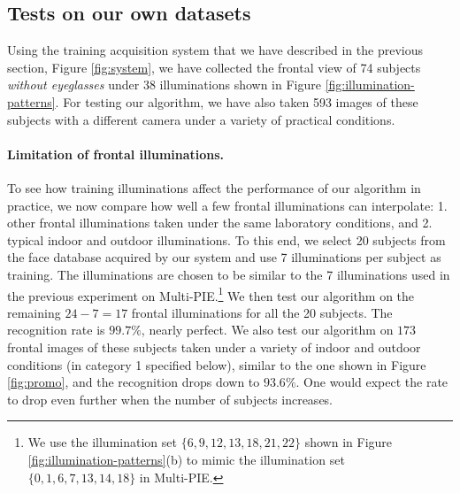 \documentclass[10pt,twocolumn,letterpaper]{article}
\begin{document}
\subsection{Tests on our own datasets}\label{sec:own-data}\vspace{-2mm}
Using the training acquisition system that we have described in the previous section, Figure \ref{fig:system}, we have collected the frontal view of 74 subjects {\em without eyeglasses} under 38 illuminations shown in Figure \ref{fig:illumination-patterns}. For testing our algorithm, we have also taken 593 images of these subjects with a different camera under a variety of practical conditions.\vspace{-4mm}

\paragraph{Limitation of frontal illuminations.}
To see how training illuminations affect the performance of our algorithm in practice, we now compare how well a few frontal illuminations can interpolate: 1. other frontal illuminations taken under the same laboratory conditions, and 2. typical indoor and outdoor illuminations. To this end, we select 20 subjects from the face database acquired by our system and use 7 illuminations per subject as training. The illuminations are chosen to be similar to the 7 illuminations used in the previous experiment on Multi-PIE.\footnote{We use the illumination set $\{6, 9, 12, 13, 18, 21, 22\}$ shown in Figure \ref{fig:illumination-patterns}(b) to mimic the illumination set $\{0, 1, 6, 7, 13, 14, 18\}$ in Multi-PIE.} We then test our algorithm on the remaining $24 - 7 = 17$ frontal illuminations for all the 20 subjects. The recognition rate is $99.7\%$, nearly perfect. We also test our algorithm on $173$ frontal images of these subjects taken under a variety of indoor and outdoor conditions (in category 1 specified below), similar to the one shown in Figure \ref{fig:promo}, and the recognition drops down to $93.6\%$. One would expect the rate to drop even further when the number of subjects increases.\vspace{-2mm}
\end{document}
